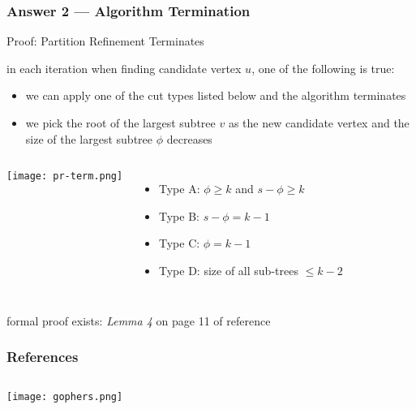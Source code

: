 \begin{frame}
    \frametitle{Answer 2 --- Algorithm Termination}
    \begin{block}{Proof: Partition Refinement Terminates}
        \scriptsize{
            in each iteration when finding candidate vertex \(u\), one of the following is true:
            \begin{itemize}
                \item we can apply one of the cut types listed below and the algorithm terminates
                \item we pick the root of the largest subtree \(v\) as the new candidate vertex and the size of the largest subtree \( \phi \) decreases
            \end{itemize}
        }
    \end{block}
    \begin{columns}
            \texttt{[image: pr-term.png]}
            \scriptsize{
                \begin{itemize}
                    \item \alert{Type A}: \( \phi \ge k \) and \(s - \phi \ge k\)
                    \item \alert{Type B}: \( s - \phi = k-1 \)
                    \item \alert{Type C}: \( \phi = k-1 \)
                    \item \alert{Type D}: size of all sub-trees \(\le k-2\)
                \end{itemize}
            }
    \end{columns}
    \scriptsize{\alert{formal proof exists}: \textit{Lemma 4} on page 11 of reference\cite{aggarwal}}
\end{frame}


\begin{frame}
    \frametitle{References}
    \begin{columns}
            
            
        \texttt{[image: gophers.png]}
    \end{columns}
\end{frame}


